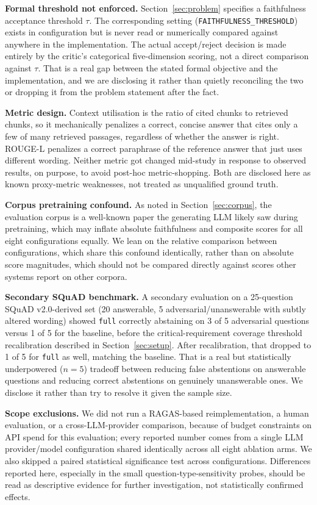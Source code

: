 \documentclass[conference]{IEEEtran}
\begin{document}
\textbf{Formal threshold not enforced.} Section~\ref{sec:problem} specifies a
faithfulness acceptance threshold $\tau$. The corresponding setting
(\texttt{FAITHFULNESS\_THRESHOLD}) exists in configuration but is never read or
numerically compared against anywhere in the implementation. The actual accept/reject
decision is made entirely by the critic's categorical five-dimension scoring, not a
direct comparison against $\tau$. That is a real gap between the stated formal
objective and the implementation, and we are disclosing it rather than quietly
reconciling the two or dropping it from the problem statement after the fact.

\textbf{Metric design.} Context utilisation is the ratio of cited chunks to retrieved
chunks, so it mechanically penalizes a correct, concise answer that cites only a few of
many retrieved passages, regardless of whether the answer is right. ROUGE-L penalizes a
correct paraphrase of the reference answer that just uses different wording. Neither
metric got changed mid-study in response to observed results, on purpose, to avoid
post-hoc metric-shopping. Both are disclosed here as known proxy-metric weaknesses, not
treated as unqualified ground truth.

\textbf{Corpus pretraining confound.} As noted in Section~\ref{sec:corpus}, the
evaluation corpus is a well-known paper the generating LLM likely saw during
pretraining, which may inflate absolute faithfulness and composite scores for all
eight configurations equally. We lean on the relative comparison between
configurations, which share this confound identically, rather than on absolute score
magnitudes, which should not be compared directly against scores other systems report
on other corpora.

\textbf{Secondary SQuAD benchmark.} A secondary evaluation on a 25-question SQuAD
v2.0-derived set (20 answerable, 5 adversarial/unanswerable with subtly altered
wording) showed \texttt{full} correctly abstaining on 3 of 5 adversarial questions
versus 1 of 5 for the baseline, before the critical-requirement coverage threshold
recalibration described in Section~\ref{sec:setup}. After recalibration, that dropped
to 1 of 5 for \texttt{full} as well, matching the baseline. That is a real but
statistically underpowered ($n=5$) tradeoff between reducing false abstentions on
answerable questions and reducing correct abstentions on genuinely unanswerable ones.
We disclose it rather than try to resolve it given the sample size.

\textbf{Scope exclusions.} We did not run a RAGAS-based reimplementation, a human
evaluation, or a cross-LLM-provider comparison, because of budget constraints on API
spend for this evaluation; every reported number comes from a single LLM
provider/model configuration shared identically across all eight ablation arms. We also
skipped a paired statistical significance test across configurations. Differences
reported here, especially in the small question-type-sensitivity probes, should be read
as descriptive evidence for further investigation, not statistically confirmed effects.
\end{document}
